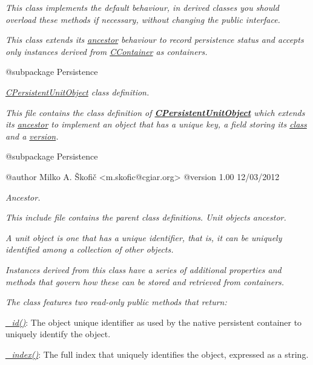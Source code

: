 {\itshape This class implements the default behaviour, in derived classes you should overload these methods if necessary, without changing the public interface.}

{\itshape This class extends its \hyperlink{class_c_status_object}{ancestor} behaviour to record persistence status and accepts only instances derived from \hyperlink{class_c_container}{C\-Container} as containers.}

{\itshape \begin{DoxyVerb} @subpackage        Persistence\end{DoxyVerb}
}

{\itshape {\itshape \hyperlink{class_c_persistent_unit_object}{C\-Persistent\-Unit\-Object}} class definition.}

{\itshape This file contains the class definition of {\bfseries \hyperlink{class_c_persistent_unit_object}{C\-Persistent\-Unit\-Object}} which extends its \hyperlink{class_c_persistent_object}{ancestor} to implement an object that has a unique key, a field storing its \hyperlink{}{class} and a \hyperlink{}{version}.}

{\itshape \begin{DoxyVerb} @subpackage        Persistence

 @author            Milko A. Škofič <m.skofic@cgiar.org>
 @version   1.00 12/03/2012\end{DoxyVerb}
}

{\itshape Ancestor.}

{\itshape This include file contains the parent class definitions. Unit objects ancestor.}

{\itshape A unit object is one that has a unique identifier, that is, it can be uniquely identified among a collection of other objects.}

{\itshape Instances derived from this class have a series of additional properties and methods that govern how these can be stored and retrieved from containers.}

{\itshape The class features two read-\/only public methods that return\-:}

{\itshape 
\begin{DoxyItemize}
\item {\itshape \hyperlink{}{\-\_\-id()}}\-: The object unique identifier as used by the native persistent container to uniquely identify the object. 
\item {\itshape \hyperlink{}{\-\_\-index()}}\-: The full index that uniquely identifies the object, expressed as a string. 
\end{DoxyItemize}}

